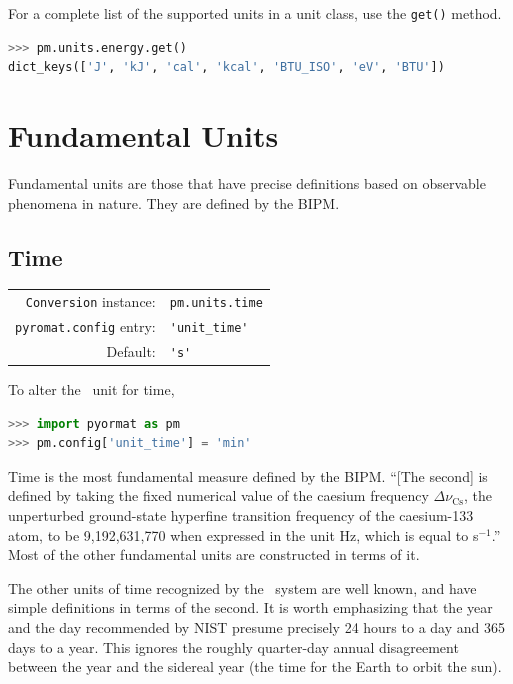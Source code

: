 For a complete list of the supported units in a unit class, use the \verb|get()| method.
\begin{lstlisting}[language=Python]
>>> pm.units.energy.get()
dict_keys(['J', 'kJ', 'cal', 'kcal', 'BTU_ISO', 'eV', 'BTU'])
\end{lstlisting}


\section{Fundamental Units}

Fundamental units are those that have precise definitions based on observable phenomena in nature.  They are defined by the BIPM.

%
%

\subsection{Time}\label{sec:units:time}

\begin{tabular}{rl}
\hline
\verb|Conversion| instance: & \verb|pm.units.time|\\
\verb|pyromat.config| entry: & \verb|'unit_time'|\\
Default: & \verb|'s'|\\
\hline
\end{tabular}
\vspace{1em}

To alter the \PM\ unit for time,
\begin{lstlisting}[language=Python]
>>> import pyormat as pm
>>> pm.config['unit_time'] = 'min'
\end{lstlisting}

Time is the most fundamental measure defined by the BIPM.  ``[The second] is defined by taking the fixed numerical value of the caesium frequency $\Delta \nu_\mathrm{Cs}$, the unperturbed ground-state hyperfine transition frequency of the caesium-133 atom, to be 9,192,631,770 when expressed in the unit Hz, which is equal to s$^{-1}$.''\cite[p.130]{si:2019}  Most of the other fundamental units are constructed in terms of it.

The other units of time recognized by the \PM\ system are well known, and have simple definitions in terms of the second.  It is worth emphasizing that the year and the day recommended by NIST \cite{nist:sp811} presume precisely 24 hours to a day and 365 days to a year.  This ignores the roughly quarter-day annual disagreement between the year and the sidereal year (the time for the Earth to orbit the sun).

